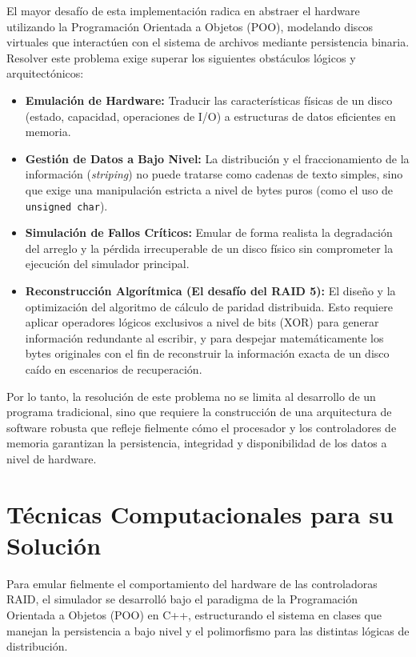 \documentclass[12pt, a4paper]{article}
\begin{document}
El mayor desafío de esta implementación radica en abstraer el hardware utilizando la Programación Orientada a Objetos (POO), modelando discos virtuales que interactúen con el sistema de archivos mediante persistencia binaria. Resolver este problema exige superar los siguientes obstáculos lógicos y arquitectónicos:

\begin{itemize}
    \item \textbf{Emulación de Hardware:} Traducir las características físicas de un disco (estado, capacidad, operaciones de I/O) a estructuras de datos eficientes en memoria.
    \item \textbf{Gestión de Datos a Bajo Nivel:} La distribución y el fraccionamiento de la información (\textit{striping}) no puede tratarse como cadenas de texto simples, sino que exige una manipulación estricta a nivel de bytes puros (como el uso de \texttt{unsigned char}).
    \item \textbf{Simulación de Fallos Críticos:} Emular de forma realista la degradación del arreglo y la pérdida irrecuperable de un disco físico sin comprometer la ejecución del simulador principal.
    \item \textbf{Reconstrucción Algorítmica (El desafío del RAID 5):} El diseño y la optimización del algoritmo de cálculo de paridad distribuida. Esto requiere aplicar operadores lógicos exclusivos a nivel de bits (XOR) para generar información redundante al escribir, y para despejar matemáticamente los bytes originales con el fin de reconstruir la información exacta de un disco caído en escenarios de recuperación.
\end{itemize}

Por lo tanto, la resolución de este problema no se limita al desarrollo de un programa tradicional, sino que requiere la construcción de una arquitectura de software robusta que refleje fielmente cómo el procesador y los controladores de memoria garantizan la persistencia, integridad y disponibilidad de los datos a nivel de hardware.

\section{Técnicas Computacionales para su Solución}

Para emular fielmente el comportamiento del hardware de las controladoras RAID, el simulador se desarrolló bajo el paradigma de la Programación Orientada a Objetos (POO) en C++, estructurando el sistema en clases que manejan la persistencia a bajo nivel y el polimorfismo para las distintas lógicas de distribución.
\end{document}
